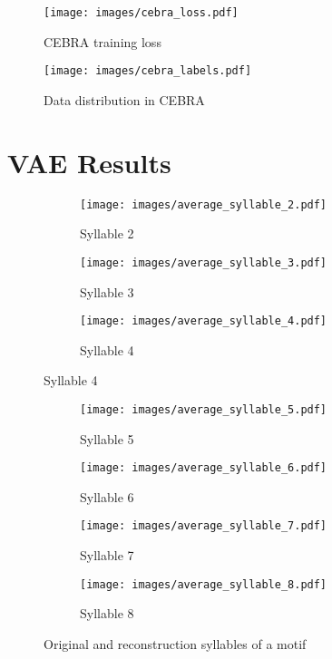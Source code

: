 \documentclass[../CLthesis.tex]{subfiles}
\begin{document}
\begin{figure}[H]
    \centering
    \texttt{[image: images/cebra\_loss.pdf]}
    \caption{CEBRA training loss}
    \label{fig:cebra_loss}
\end{figure}

\begin{figure}[H]
    \centering
    \texttt{[image: images/cebra\_labels.pdf]}
    \caption{Data distribution in CEBRA}
    \label{fig:cebra_labels}
\end{figure}

\section{VAE Results}
\label{appendix:VAE}
\begin{figure}[H]
   \begin{subfigure}[b]{0.32\textwidth}
       \centering
       \texttt{[image: images/average\_syllable\_2.pdf]}
       \caption{Syllable 2}
       \label{fig:syllable_2}
   \end{subfigure}
   \hfill
   \begin{subfigure}[b]{0.32\textwidth}
       \centering
       \texttt{[image: images/average\_syllable\_3.pdf]}
       \caption{Syllable 3}
       \label{fig:syllable_3}
   \end{subfigure}
   \hfill
   \begin{subfigure}[b]{0.32\textwidth}
       \centering
       \texttt{[image: images/average\_syllable\_4.pdf]}
       \caption{Syllable 4}
       \label{fig:syllable_4}
   \end{subfigure}
\end{figure}
\begin{figure}[H]
   \begin{subfigure}[b]{0.32\textwidth}
       \centering
       \texttt{[image: images/average\_syllable\_5.pdf]}
       \caption{Syllable 5}
       \label{fig:syllable_5}
   \end{subfigure}
   \hfill
   \begin{subfigure}[b]{0.32\textwidth}
       \centering
       \texttt{[image: images/average\_syllable\_6.pdf]}
       \caption{Syllable 6}
       \label{fig:syllable_6}
   \end{subfigure}
   \hfill
   \begin{subfigure}[b]{0.32\textwidth}
       \centering
       \texttt{[image: images/average\_syllable\_7.pdf]}
       \caption{Syllable 7}
       \label{fig:syllable_7}
   \end{subfigure}

   \begin{subfigure}[b]{0.32\textwidth}
       \centering
       \texttt{[image: images/average\_syllable\_8.pdf]}
       \caption{Syllable 8}
       \label{fig:syllable_8}
   \end{subfigure}
   
   \caption{Original and reconstruction syllables of a motif}
   \label{fig:all_syllables}
\end{figure}
\end{document}
